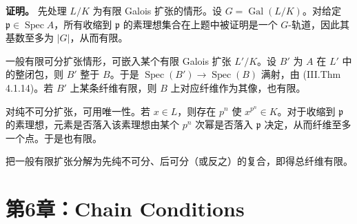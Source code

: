 \documentclass[a4paper]{ctexart}
\begin{document}
\begin{enumerate}[leftmargin=*, label=\textbf{5.\arabic*.}]
\textbf{证明。}
先处理 \(L/K\) 为有限 Galois 扩张的情形。设 \(G=\operatorname{Gal}(L/K)\)。对给定 \(\mathfrak p\in\operatorname{Spec}A\)，所有收缩到 \(\mathfrak p\) 的素理想集合在上题中被证明是一个 \(G\)-轨道，因此其基数至多为 \(|G|\)，从而有限。

一般有限可分扩张情形，可嵌入某个有限 Galois 扩张 \(L'/K\)。设 \(B'\) 为 \(A\) 在 \(L'\) 中的整闭包，则 \(B'\) 整于 \(B\)。于是 \(\operatorname{Spec}(B')\to \operatorname{Spec}(B)\) 满射，由 (III.Thm 4.1.14)。若 \(B'\) 上某条纤维有限，则 \(B\) 上对应纤维作为其像，也有限。

对纯不可分扩张，可用唯一性。若 \(x\in L\)，则存在 \(p^n\) 使 \(x^{p^n}\in K\)。对于收缩到 \(\mathfrak p\) 的素理想，元素是否落入该素理想由某个 \(p^n\) 次幂是否落入 \(\mathfrak p\) 决定，从而纤维至多一个点。于是也有限。

把一般有限扩张分解为先纯不可分、后可分（或反之）的复合，即得总纤维有限。
\end{enumerate}

\section{第6章：Chain Conditions}
\end{document}
